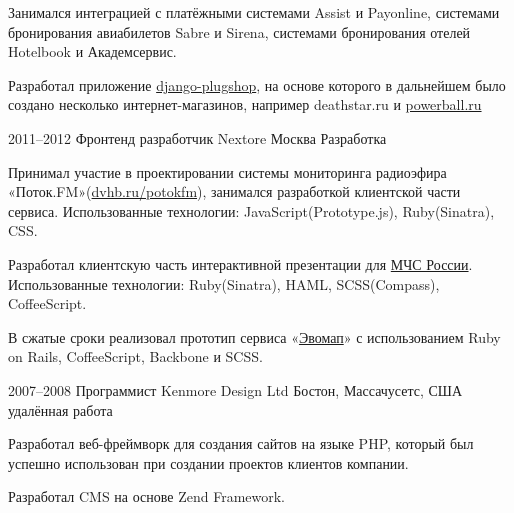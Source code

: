 \documentclass[11pt,a4paper,sans]{moderncv}
\newcommand{\lang}[2]{#1}
\begin{document}
\cvlistitem
    {\lang
        {Занимался интеграцией с платёжными системами Assist и Payonline, системами бронирования авиабилетов Sabre и Sirena, системами бронирования отелей Hotelbook и Академсервис.}
        {TODO}}

\cvlistitem
    {\lang
        {Разработал приложение \href{https://github.com/ChillyBwoy/django-plugshop}{django-plugshop}, на основе которого в дальнейшем было создано несколько интернет-магазинов, например deathstar.ru и \href{http://powerball.ru}{powerball.ru}}
        {Design applications ... TODO}\newline}


\cventry
    {2011--2012}
    {\lang
        {Фронтенд разработчик}
        {Front End Developer}}
    {Nextore}
    {\lang
        {Москва}
        {Moscow}}
    {}
    {\lang
        {Разработка}
        {Development}}

\cvlistitem
    {\lang
        {Принимал участие в проектировании системы мониторинга радиоэфира «Поток.FM»(\href{https://dvhb.ru/potokfm}{dvhb.ru/potokfm}), занимался разработкой клиентской части сервиса. Использованные технологии: JavaScript(Prototype.js), Ruby(Sinatra), CSS.}
        {Participated in design of system for monitoring of radio broadcasting, designed front-end part of the project. «Potok.FM»(\href{https://dvhb.ru/en/potokfm}{dvhb.ru/potokfm})}}

\cvlistitem
    {\lang
        {Разработал клиентскую часть интерактивной презентации для \href{http://nextore.ru/projects/3}{МЧС России}. Использованные технологии: Ruby(Sinatra), HAML, SCSS(Compass), CoffeeScript.}
        {TODO}}

\cvlistitem
    {\lang
        {В сжатые сроки реализовал прототип сервиса «\href{http://dvhb.ru/evomap}{Эвомап}» с использованием Ruby on Rails, CoffeeScript, Backbone и SCSS.}
        {TODO}\newline}


\cventry
    {2007--2008}
    {\lang
        {Программист}
        {Developer}}
    {Kenmore Design Ltd}
    {\lang
        {Бостон, Массачусетс, США}
        {Boston, MA, US}}
    {\lang
        {удалённая работа}
        {remote work}}
    {}

\cvlistitem
    {\lang
        {Разработал веб-фреймворк для создания сайтов на языке PHP, который был успешно использован при создании проектов клиентов компании.}
        {TODO}}

\cvlistitem
    {\lang
        {Разработал CMS на основе Zend Framework.}
        {TODO}\newline}
\end{document}
